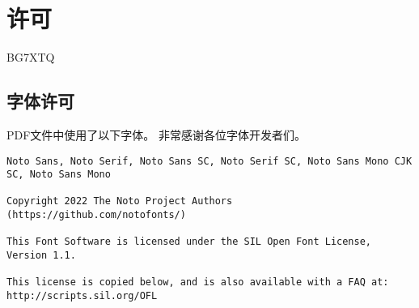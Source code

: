 \chapter*{许可}

\noindent {} BG7XTQ

\section*{字体许可}

\noindent PDF文件中使用了以下字体。
非常感谢各位字体开发者们。

\begin{verbatim}
Noto Sans, Noto Serif, Noto Sans SC, Noto Serif SC, Noto Sans Mono CJK SC, Noto Sans Mono

Copyright 2022 The Noto Project Authors (https://github.com/notofonts/)

This Font Software is licensed under the SIL Open Font License,
Version 1.1.

This license is copied below, and is also available with a FAQ at:
http://scripts.sil.org/OFL

\end{verbatim}
